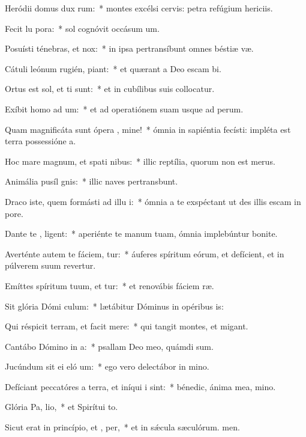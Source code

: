 \item Heródii domus dux  rum:~* montes excélsi cervis: petra refúgium hericiis.
\item Fecit lu  pora:~* sol cognóvit occásum um.
\item Posuísti ténebras, et   nox:~* in ipsa pertransíbunt omnes béstiæ væ.
\item Cátuli leónum rugién,  piant:~* et quærant a Deo escam bi.
\item Ortus est sol, et ti sunt:~* et in cubílibus suis collocatur.
\item Exíbit homo ad  um:~* et ad operatiónem suam usque ad perum.
\item Quam magnificáta sunt ópera , mine!~* ómnia in sapiéntia fecísti: impléta est terra possessióne a.
\item Hoc mare magnum, et spati nibus:~* illic reptília, quorum non est merus.
\item Animália pusíl  gnis:~* illic naves pertransbunt.
\item Draco iste, quem formásti ad illu i:~* ómnia a te exspéctant ut des illis escam in pore.
\item Dante te , ligent:~* aperiénte te manum tuam, ómnia implebúntur bonite.
\item Averténte autem te fáciem, tur:~* áuferes spíritum eórum, et defícient, et in púlverem suum revertur.
\item Emíttes spíritum tuum, et tur:~* et renovábis fáciem ræ.
\item Sit glória Dómi  culum:~* lætábitur Dóminus in opéribus is:
\item Qui réspicit terram, et facit  mere:~* qui tangit montes, et migant.
\item Cantábo Dómino in  a:~* psallam Deo meo, quámdi sum.
\item Jucúndum sit ei eló um:~* ego vero delectábor in mino.
\item Defíciant peccatóres a terra, et iníqui i   sint:~* bénedic, ánima mea, mino.
\item Glória Pa,  lio,~* et Spirítui to.
\item Sicut erat in princípio, et ,  per,~* et in sǽcula sæculórum. men.
